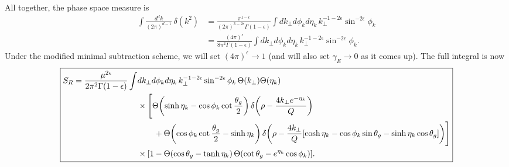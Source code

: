 \documentclass[11pt,twoside,reqno]{amsart}
\theoremstyle{plain}
\theoremstyle{remark}
\theoremstyle{definition}
\theoremstyle{remark}
\theoremstyle{definition}
\theoremstyle{definition}
\begin{document}
	All together, the phase space measure is
	\begin{equation}
	\begin{aligned}
		\int \frac{d^d k}{(2\pi)^{d-1}}\,\delta(k^2) &= \frac{\pi^{1-\epsilon}}{(2\pi)^{3-2\epsilon}\Gamma(1 - \epsilon)}\int dk_\perp d\phi_k d\eta_k \, k_\perp^{-1-2\epsilon} \sin^{-2\epsilon}\phi_k \\
		&= \frac{(4\pi)^\epsilon}{8\pi^2 \Gamma(1-\epsilon)} \int dk_\perp d\phi_k d\eta_k\,k_\perp^{-1-2\epsilon} \sin^{-2\epsilon}\phi_k.
	\end{aligned}
	\end{equation}
	Under the modified minimal subtraction scheme, we will set $(4\pi)^\epsilon \to 1$ (and will also set $\gamma_E \to 0$ as it comes up). The full integral is now
	\begin{equation}\label{eq:full integral}
	\boxed{
	\begin{aligned}
		S_R = \frac{\mu^{2\epsilon}}{2\pi^2\Gamma(1 - \epsilon)} \int& dk_\perp d\phi_k d\eta_k\, k_\perp^{-1-2\epsilon} \sin^{-2\epsilon}\phi_k \, \Theta(k_\perp)\Theta(\eta_k) \\
		&\times \Bigg[ \Theta\qty(\sinh\eta_k - \cos\phi_k\cot\frac{\theta_g}{2})\,\delta\qty(\rho - \frac{4 k_\perp e^{-\eta_k}}{Q}) \\
			&\qquad+ \Theta\qty(\cos\phi_k\cot\frac{\theta_g}{2} - \sinh\eta_k)\, \delta\qty(\rho - \frac{4 k_\perp}{Q}\qty[\cosh\eta_k - \cos\phi_k\sin\theta_g - \sinh\eta_k\cos\theta_g])\Bigg] \\
			&\times \qty[1 - \Theta(\cos\theta_g - \tanh\eta_k)\,\Theta\qty(\cot\theta_g - e^{\eta_k}\cos\phi_k)].
	\end{aligned}
	}
	\end{equation}
\end{document}
